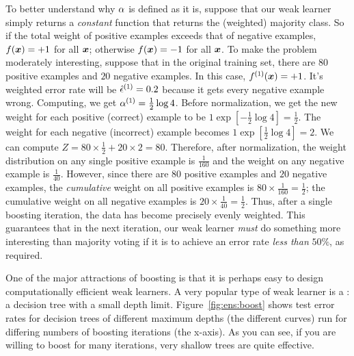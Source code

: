 To better understand why $\alpha$ is defined as it is, suppose that our
weak learner simply returns a \emph{constant} function that returns
the (weighted) majority class.  So if the total weight of positive
examples exceeds that of negative examples, $f({\boldsymbol{x}}) = +1$ for all
${\boldsymbol{x}}$; otherwise $f({\boldsymbol{x}}) = -1$ for all ${\boldsymbol{x}}$.  To make the problem
moderately interesting, suppose that in the original training set,
there are $80$ positive examples and $20$ negative examples.  In this
case, $f\oth(\vx)=+1$.  It's weighted error rate will be $\hat\ep\oth
= 0.2$ because it gets every negative example wrong.  Computing, we
get $\al\oth = \frac12\log 4$.  Before normalization, we get the new
weight for each positive (correct) example to be $1 \exp[-\frac12\log
4] = \frac12$.  The weight for each negative (incorrect) example
becomes $1 \exp[\frac12\log 4] = 2$.  We can compute $Z = 80 \times
\frac 1 2 + 20 \times 2 = 80$.  Therefore, after normalization, the
weight distribution on any single positive example is $\frac 1 {160}$
and the weight on any negative example is $\frac 1 {40}$.  However,
since there are $80$ positive examples and $20$ negative examples, the
\emph{cumulative} weight on all positive examples is $80 \times \frac
1 {160} = \frac 1 2$; the cumulative weight on all negative examples
is $20 \times \frac 1{40} = \frac12$.  Thus, after a single boosting
iteration, the data has become precisely evenly weighted.  This
guarantees that in the next iteration, our weak learner \emph{must} do
something more interesting than majority voting if it is to achieve an
error rate \emph{less than} $50\%$, as required.



One of the major attractions of boosting is that it is perhaps easy to
design computationally efficient weak learners.  A very popular type
of weak learner is a : a decision tree
with a small depth limit.  Figure~\ref{fig:ens:boost} shows test error
rates for decision trees of different maximum depths (the different
curves) run for differing numbers of boosting iterations (the
x-axis).  As you can see, if you are willing to boost for many
iterations, very shallow trees are quite effective.

